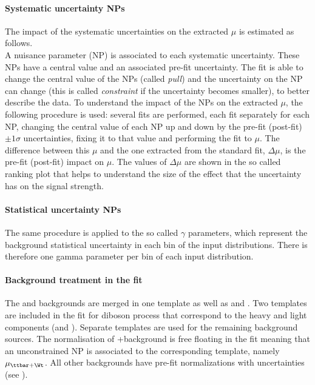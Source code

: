 \paragraph{Systematic uncertainty NPs} The impact of the systematic
uncertainties on the extracted $\mu$ is estimated as follows. \\
A nuisance parameter (NP) is associated to each systematic uncertainty.
These NPs have a central value and an associated pre-fit uncertainty.
The fit is able to change the central value of the NPs (called \textit{pull})
and the uncertainty on the NP can change (this is called \textit{constraint}
if the uncertainty becomes smaller), to better describe the data.
To understand the impact of the NPs on the extracted $\mu$, the
following procedure is used:
several fits are performed, each fit separately for each NP,
changing the central value of each NP up and down by the pre-fit
(post-fit) $\pm 1 \sigma$ uncertainties,
fixing it to that value and performing the fit to $\mu$.
The difference between this $\mu$ and the one extracted from the
standard fit, $\Delta\mu$, is the pre-fit (post-fit) impact on $\mu$.
The values of $\Delta\mu$ are shown in the so called ranking plot that 
helps to understand the size of the effect that
the uncertainty has on the signal strength. \\

\paragraph{Statistical uncertainty NPs} The same procedure is applied
to the so called $\gamma$ parameters, which represent the background
statistical uncertainty in each bin of the input distributions.
There is therefore one gamma parameter per bin of each input distribution. 

\paragraph{Background treatment in the fit} The \ttZ and \tWZ backgrounds are merged in one template as well as
\ttbar and \Wt. Two templates are included in the fit for diboson process that correspond to the heavy and light components (\VVHF and \VVLF).
Separate templates are used for the remaining background sources.
The normalisation of \ttbar+\Wt background is free floating in the fit meaning that an unconstrained NP is associated to the corresponding template, namely $\mu_{\ttbar+\Wt}$.
All other backgrounds have pre-fit normalizations with uncertainties (see ).

